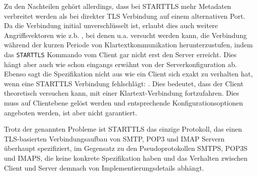 Zu den Nachteilen gehört allerdings, dass bei STARTTLS mehr Metadaten verbreitet werden als bei direkter TLS Verbindung auf einem alternativen Port. Da die Verbindung initial unverschlüsselt ist, erlaubt dies auch weitere Angriffsvektoren wie z.b. , bei denen u.a. versucht werden kann, die Verbindung während der kurzen Periode von Klartextkommunikation herunterzustufen, indem das \verb#STARTTLS# Kommando vom Client gar nicht erst den Server erreicht. Dies hängt aber auch wie schon eingangs erwähnt von der Serverkonfiguration ab. Ebenso sagt die Spezifikation nicht aus wie ein Client sich exakt zu verhalten hat, wenn eine STARTTLS Verbindung fehlschlägt: .
Dies bedeutet, dass der Client theoretisch versuchen kann, mit einer Klartext-Verbindung fortzufahren.
Dies muss auf Clientebene gelöst werden und entsprechende Konfigurationsoptionen angeboten werden, ist aber nicht garantiert.

Trotz der genannten Probleme ist STARTTLS das einzige Protokoll, das einen TLS-basierten Verbindungsaufbau von SMTP, POP3 und IMAP Servern überhaupt spezifiziert, im Gegensatz zu den Pseudoprotokollen SMTPS, POP3S und IMAPS, die keine konkrete Spezifikation haben und das Verhalten zwischen Client und Server demnach von Implementierungsdetails abhängt.
